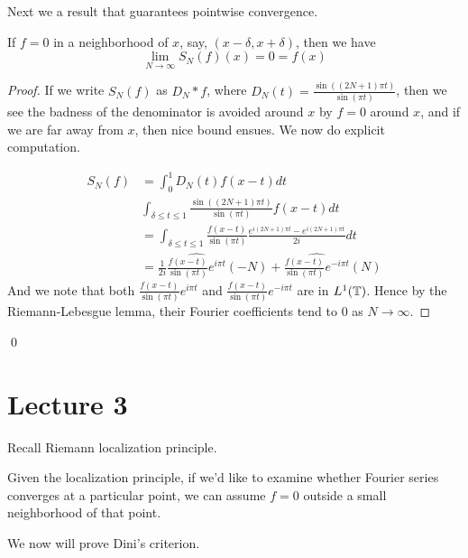 Next we a result that guarantees pointwise convergence.
\begin{theorem}
    If $f=0$ in a neighborhood of $x$, say, $(x-\delta, x+\delta)$, then we have
    \begin{equation*}
        \lim_{N\to\infty}S_N(f)(x)=0=f(x)
    \end{equation*}
\end{theorem}
\begin{proof}
    If we write $S_N(f)$ as $D_N\ast f$, where $D_N(t)=\frac{\sin((2N+1)\pi t)}{\sin(\pi t)}$, then we see the badness of the denominator is avoided around $x$ by $f=0$ around $x$, and if we are far away from $x$, then nice bound ensues. We now do explicit computation.

    \begin{align*}
        S_N(f)&=\int_0^1 D_N(t)f(x-t)dt\\
        &\int_{\delta\leq t\leq 1}\frac{\sin((2N+1)\pi t)}{\sin(\pi t)}f(x-t)dt\\
        &=\int_{\delta\leq t\leq 1}\frac{f(x-t)}{\sin(\pi t)}\frac{e^{i(2N+1)\pi t}-e^{i(2N+1)\pi t}}{2i}dt\\
        &=\frac{1}{2i}\widehat{\frac{f(x-t)}{\sin(\pi t)}e^{i\pi t}}(-N)+\widehat{\frac{f(x-t)}{\sin(\pi t)}e^{-i\pi t}}(N)
    \end{align*}
    And we note that both $\frac{f(x-t)}{\sin(\pi t)}e^{i\pi t}$ and $\frac{f(x-t)}{\sin(\pi t)}e^{-i\pi t}$ are in $L^1(\mathbb{T})$. Hence by the Riemann-Lebesgue lemma, their Fourier coefficients tend to 0 as $N\to\infty$. 
\end{proof}
\qed


\section{Lecture 3}
Recall Riemann localization principle.

\begin{remark}
    Given the localization principle, if we'd like to examine whether Fourier series converges at a particular point, we can assume $f=0$ outside a small neighborhood of that point.
\end{remark}

We now will prove Dini's criterion.

